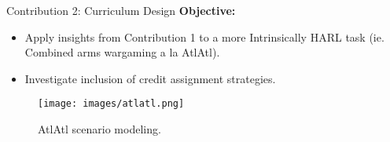 \documentclass[xcolor={svgnames}]{beamer}
\begin{document}

\begin{frame}{Contribution 2: Curriculum Design}
    \textbf{Objective:}
    \begin{itemize}
        \item Apply insights from Contribution 1 to a more Intrinsically HARL task 
        (ie. Combined arms wargaming a la AtlAtl).
        \item Investigate inclusion of credit assignment strategies.
    \end{itemize}
    \begin{figure}
        \centering
        \texttt{[image: images/atlatl.png]}
        \caption{AtlAtl scenario modeling.}
    \end{figure}
\end{frame}


\begin{comment}
    

\begin{frame}{Exploring Evolutionary Biology Insights}
    \textbf{Research Interest:}
    \begin{itemize}
        \item Investigate how evolutionary principles can inform cooperation development.
        \item Examine speciation and specialization as sub-populations find roles in complex tasks.
        \item Apply biologically-inspired mechanisms to improve agent diversity and adaptability.
    \end{itemize}
\end{frame}

\end{comment}

\end{document}
